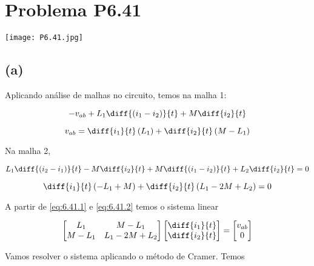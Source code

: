 
\section*{Problema P6.41}

\renewcommand*\thesection{6.41}

\begin{center}
    \texttt{[image: P6.41.jpg]}
\end{center}

\subsection*{(a)}

Aplicando análise de malhas no circuito, temos na malha 1:

\[ -v_{ab} + L_1\diff{(i_1 - i_2)}{t} + M\diff{i_2}{t} \]   

\begin{equation}\label{eq:6.41.1}
    v_{ab} = \diff{i_1}{t}\left(L_1\right) + \diff{i_2}{t}\left(M - L_1\right)
\end{equation}

Na malha 2,

\[ L_1\diff{(i_2 - i_1)}{t} - M\diff{i_2}{t} + M\diff{(i_1 - i_2)}{t} + L_2\diff{i_2}{t} = 0 \]   

\begin{equation}\label{eq:6.41.2}
    \diff{i_1}{t}\left(-L_1 + M\right) + \diff{i_2}{t}\left(L_1 - 2M + L_2\right) = 0
\end{equation}

A partir de \eqref{eq:6.41.1} e \eqref{eq:6.41.2} temos o sistema linear

\begingroup
\renewcommand*{\arraystretch}{4}

\[
    \begin{bmatrix}
        L_1 & M - L_1    \\
        M - L_1    & L_1 - 2M + L_2
    \end{bmatrix}
    \begin{bmatrix}
        \diff{i_1}{t} \\
        \diff{i_2}{t}
    \end{bmatrix}
    =
    \begin{bmatrix}
        v_{ab} \\
        0
    \end{bmatrix}
\]

\endgroup

Vamos resolver o sistema aplicando o método de Cramer. Temos

